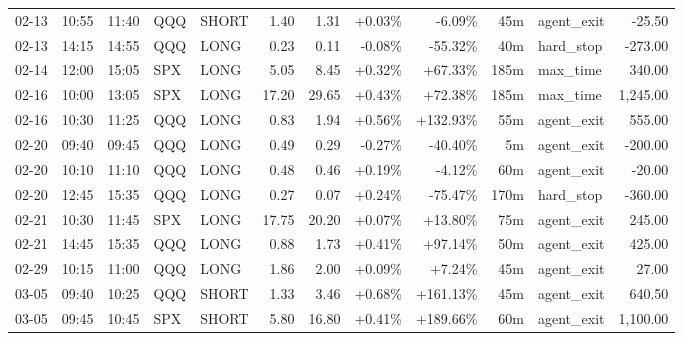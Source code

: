 \documentclass[11pt,a4paper,twoside]{article}
\begin{document}
\begin{center}
\begin{longtable}{>{\color{txtmain}}l l l l l r r r r r >{\color{txtmain}}l r}
02-13 & 10:55 & 11:40 & QQQ & SHORT & 1.40 & 1.31 & \textcolor{wingreen}{+0.03\%} & \textcolor{lossred}{-6.09\%} & 45m & agent\_exit & \textcolor{lossred}{-25.50} \\
02-13 & 14:15 & 14:55 & QQQ & LONG & 0.23 & 0.11 & \textcolor{lossred}{-0.08\%} & \textcolor{lossred}{-55.32\%} & 40m & hard\_stop & \textcolor{lossred}{-273.00} \\
02-14 & 12:00 & 15:05 & SPX & LONG & 5.05 & 8.45 & \textcolor{wingreen}{+0.32\%} & \textcolor{wingreen}{+67.33\%} & 185m & max\_time & \textcolor{wingreen}{340.00} \\
02-16 & 10:00 & 13:05 & SPX & LONG & 17.20 & 29.65 & \textcolor{wingreen}{+0.43\%} & \textcolor{wingreen}{+72.38\%} & 185m & max\_time & \textcolor{wingreen}{1,245.00} \\
02-16 & 10:30 & 11:25 & QQQ & LONG & 0.83 & 1.94 & \textcolor{wingreen}{+0.56\%} & \textcolor{wingreen}{+132.93\%} & 55m & agent\_exit & \textcolor{wingreen}{555.00} \\
02-20 & 09:40 & 09:45 & QQQ & LONG & 0.49 & 0.29 & \textcolor{lossred}{-0.27\%} & \textcolor{lossred}{-40.40\%} & 5m & agent\_exit & \textcolor{lossred}{-200.00} \\
02-20 & 10:10 & 11:10 & QQQ & LONG & 0.48 & 0.46 & \textcolor{wingreen}{+0.19\%} & \textcolor{lossred}{-4.12\%} & 60m & agent\_exit & \textcolor{lossred}{-20.00} \\
02-20 & 12:45 & 15:35 & QQQ & LONG & 0.27 & 0.07 & \textcolor{wingreen}{+0.24\%} & \textcolor{lossred}{-75.47\%} & 170m & hard\_stop & \textcolor{lossred}{-360.00} \\
02-21 & 10:30 & 11:45 & SPX & LONG & 17.75 & 20.20 & \textcolor{wingreen}{+0.07\%} & \textcolor{wingreen}{+13.80\%} & 75m & agent\_exit & \textcolor{wingreen}{245.00} \\
02-21 & 14:45 & 15:35 & QQQ & LONG & 0.88 & 1.73 & \textcolor{wingreen}{+0.41\%} & \textcolor{wingreen}{+97.14\%} & 50m & agent\_exit & \textcolor{wingreen}{425.00} \\
02-29 & 10:15 & 11:00 & QQQ & LONG & 1.86 & 2.00 & \textcolor{wingreen}{+0.09\%} & \textcolor{wingreen}{+7.24\%} & 45m & agent\_exit & \textcolor{wingreen}{27.00} \\
03-05 & 09:40 & 10:25 & QQQ & SHORT & 1.33 & 3.46 & \textcolor{wingreen}{+0.68\%} & \textcolor{wingreen}{+161.13\%} & 45m & agent\_exit & \textcolor{wingreen}{640.50} \\
03-05 & 09:45 & 10:45 & SPX & SHORT & 5.80 & 16.80 & \textcolor{wingreen}{+0.41\%} & \textcolor{wingreen}{+189.66\%} & 60m & agent\_exit & \textcolor{wingreen}{1,100.00} \\

\end{longtable}
\end{center}
\end{document}
